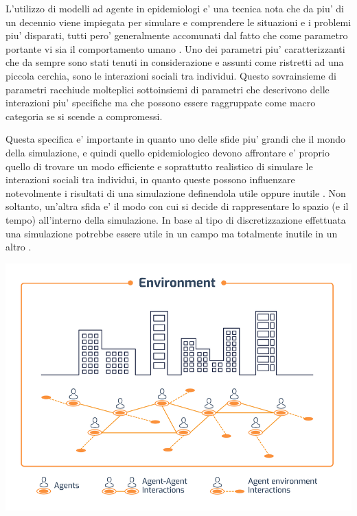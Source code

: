 L'utilizzo di modelli ad agente in epidemiologi e' una tecnica nota che 
da piu' di un decennio viene impiegata per simulare e comprendere le 
situazioni e i problemi piu' disparati, tutti pero' generalmente accomunati
dal fatto che come parametro portante vi sia il comportamento umano \cite{Groff2019}
\cite{El-Sayed2012-ac} \cite{Tracy2018-lc} \cite{Bissett2021}. 
Uno dei parametri piu' caratterizzanti che da sempre sono stati tenuti 
in considerazione e assunti come ristretti ad una piccola cerchia, sono 
le interazioni sociali tra individui. Questo sovrainsieme di parametri 
racchiude molteplici sottoinsiemi di parametri che descrivono delle 
interazioni piu' specifiche ma che possono essere raggruppate come macro 
categoria se si scende a compromessi. 

Questa specifica e' importante in quanto uno delle sfide piu' grandi che 
il mondo della simulazione, e quindi quello epidemiologico devono affrontare
e' proprio quello di trovare un modo efficiente e soprattutto realistico 
di simulare le interazioni sociali tra individui, in quanto queste possono
influenzare notevolmente i risultati di una simulazione definendola utile
oppure inutile \cite{Silverman2021}. Non soltanto, un'altra sfida e' il modo 
con cui si decide di rappresentare lo spazio (e il tempo) all'interno della
simulazione. In base al tipo di discretizzazione effettuata una simulazione
potrebbe essere utile in un campo ma totalmente inutile in un altro 
\cite{KONSTANTINOUDIS2020100319}.

\begin{minipage}{\linewidth}
    \centering
    \includegraphics[scale=0.5]{img/Schematic-representation-of-an-agent-based-model-ABM.png}
    \label{fig:schematic_representation_abm}
\end{minipage}

